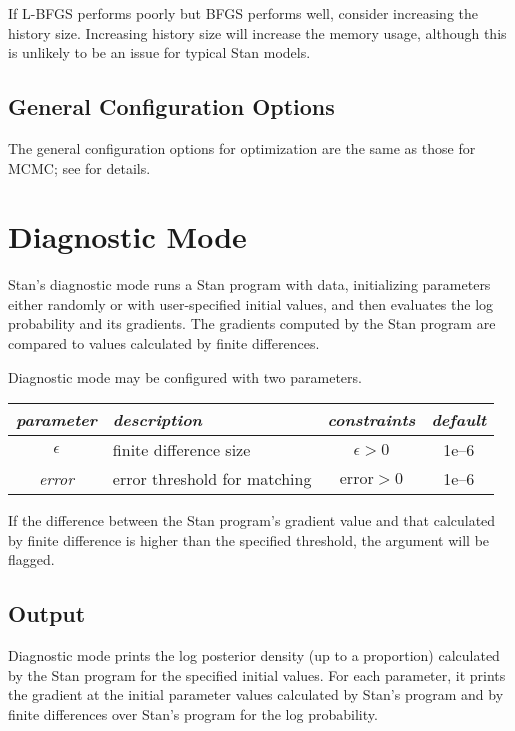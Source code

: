 If L-BFGS performs poorly but BFGS performs well, consider increasing
the history size. Increasing history size will increase the
memory usage, although this is unlikely to be an issue for typical
Stan models.


\section{General Configuration Options}

The general configuration options for optimization are the same as
those for MCMC;  see  for details.


\chapter{Diagnostic Mode}\label{diagnostic-algorithms.chapter}

\noindent
Stan's diagnostic mode runs a Stan program with data, initializing
parameters either randomly or with user-specified initial values, and
then evaluates the log probability and its gradients. The gradients
computed by the Stan program are compared to values calculated by
finite differences.

Diagnostic mode may be configured with two parameters.
%
\begin{center}
\begin{tabular}{c|lcc}
{\it parameter} & {\it description} & {\it constraints} & {\it
  default}
\\ \hline
{\it $\epsilon$} & finite difference size & $\epsilon > 0$ & 1e--6
\\
{\it error} & error threshold for matching & $\mbox{error} > 0$ & 1e--6
\end{tabular}
\end{center}
%
If the difference between the Stan program's gradient value and that
calculated by finite difference is higher than the specified
threshold, the argument will be flagged.

\section{Output}

Diagnostic mode prints the log posterior density (up to a proportion)
calculated by the Stan program for the specified initial values. For
each parameter, it prints the gradient at the initial parameter values
calculated by Stan's program and by finite differences over Stan's
program for the log probability.  

